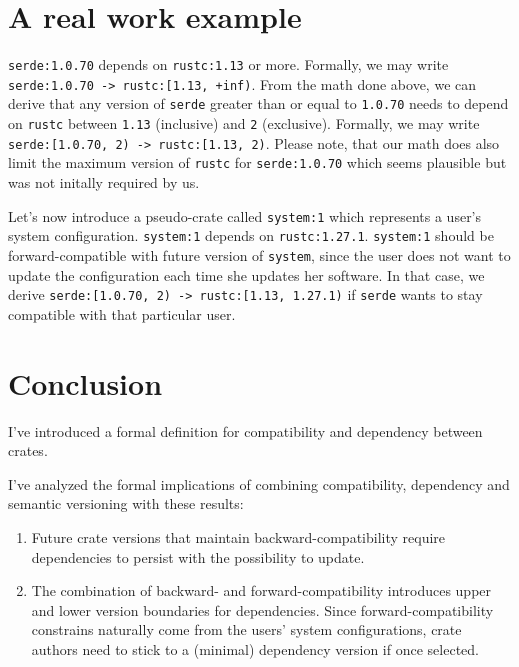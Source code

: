 \documentclass{article}
\begin{document}
    \section{A real work example}
    \texttt{serde:1.0.70} depends on \texttt{rustc:1.13} or more. Formally, we may write \texttt{serde:1.0.70 -> rustc:[1.13, +inf)}. From the math done above, we can derive that any version of \texttt{serde} greater than or equal to \texttt{1.0.70} needs to depend on \texttt{rustc} between \texttt{1.13} (inclusive) and \texttt{2} (exclusive). Formally, we may write \texttt{serde:[1.0.70, 2) -> rustc:[1.13, 2)}. Please note, that our math does also limit the maximum version of \texttt{rustc} for \texttt{serde:1.0.70} which seems plausible but was not initally required by us.

    Let's now introduce a pseudo-crate called \texttt{system:1} which represents a user's system configuration. \texttt{system:1} depends on \texttt{rustc:1.27.1}. \texttt{system:1} should be forward-compatible with future version of \texttt{system}, since the user does not want to update the configuration each time she updates her software. In that case, we derive \texttt{serde:[1.0.70, 2) -> rustc:[1.13, 1.27.1)} if \texttt{serde} wants to stay compatible with that particular user.

    \section{Conclusion}
    I've introduced a formal definition for compatibility  and dependency between crates.

    I've analyzed the formal implications of combining compatibility, dependency and semantic versioning with these results:
    \begin{enumerate}
        \item Future crate versions that maintain backward-compatibility require dependencies to persist with the possibility to update.
        \item The combination of backward- and forward-compatibility introduces upper and lower version boundaries for dependencies. Since forward-compatibility constrains naturally come from the users' system configurations, crate authors need to stick to a (minimal) dependency version if once selected.
    \end{enumerate}
\end{document}
